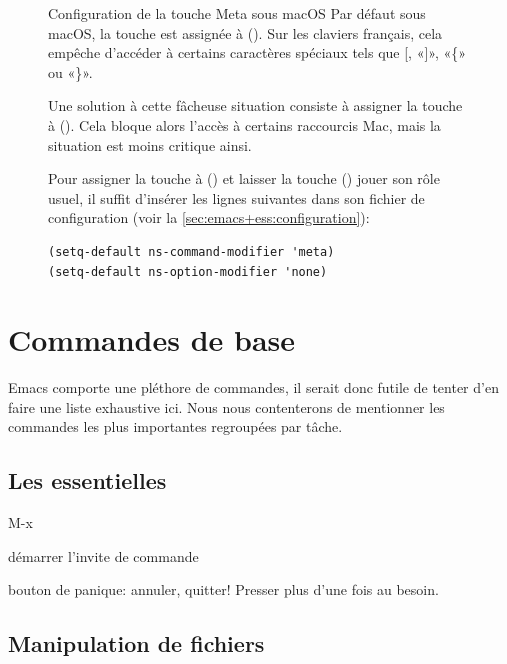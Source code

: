 \begin{figure}[t]
  \label{fig:ess:meta}
  \begin{titled-frame}{Configuration de la touche Meta sous macOS}
    Par défaut sous macOS, la touche  est assignée à
     (\optkey). Sur les claviers français, cela empêche
    d'accéder à certains caractères spéciaux tels que {\og}[{\fg},
    «]», «\{» ou «\}».

    Une solution à cette fâcheuse situation consiste à assigner
    la touche  à  (\cmdkey). Cela bloque
    alors l'accès à certains raccourcis Mac, mais la situation est
    moins critique ainsi.

    Pour assigner la touche  à  (\cmdkey) et
    laisser la touche  (\optkey) jouer son rôle usuel, il
    suffit d'insérer les lignes suivantes dans son fichier de
    configuration  (voir la
    \autoref{sec:emacs+ess:configuration}):
\begin{verbatim}
(setq-default ns-command-modifier 'meta)
(setq-default ns-option-modifier 'none)
\end{verbatim}
  \end{titled-frame}
\end{figure}



\section{Commandes de base}
\label{sec:emacs+ess:commandes}

Emacs comporte une pléthore de commandes, il serait donc futile de
tenter d'en faire une liste exhaustive ici. Nous nous contenterons de
mentionner les commandes les plus importantes regroupées par tâche.

\subsection{Les essentielles}
\label{sec:emacs+ess:commandes:essentielles}

\begin{ttscript}{M-x}
\item[\code{M-x}] démarrer l'invite de commande
\item[\code{C-g}] bouton de panique: annuler, quitter! Presser plus
  d'une fois au besoin.
\end{ttscript}

\subsection{Manipulation de fichiers}
\label{sec:emacs+ess:commandes:fichiers}

